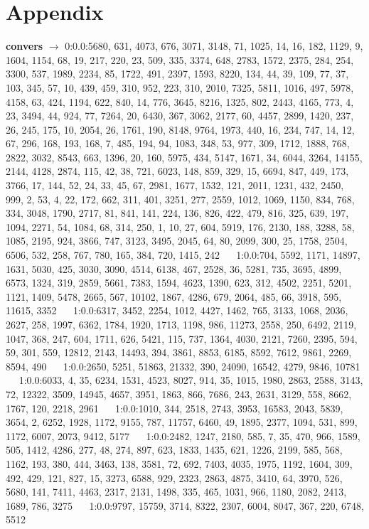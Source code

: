 \documentclass[a4paper,11pt,oneside]{book}
\begin{document}
\chapter{Appendix}

\textbf{convers} $\rightarrow$	0:0.0:5680, 631, 4073, 676, 3071, 3148, 71, 1025, 14, 16, 182, 1129, 9, 1604, 1154, 68, 19, 217, 220, 23, 509, 335, 3374, 648, 2783, 1572, 2375, 284, 254, 3300, 537, 1989, 2234, 85, 1722, 491, 2397, 1593, 8220, 134, 44, 39, 109, 77, 37, 103, 345, 57, 10, 439, 459, 310, 952, 223, 310, 2010, 7325, 5811, 1016, 497, 5978, 4158, 63, 424, 1194, 622, 840, 14, 776, 3645, 8216, 1325, 802, 2443, 4165, 773, 4, 23, 3494, 44, 924, 77, 7264, 20, 6430, 367, 3062, 2177, 60, 4457, 2899, 1420, 237, 26, 245, 175, 10, 2054, 26, 1761, 190, 8148, 9764, 1973, 440, 16, 234, 747, 14, 12, 67, 296, 168, 193, 168, 7, 485, 194, 94, 1083, 348, 53, 977, 309, 1712, 1888, 768, 2822, 3032, 8543, 663, 1396, 20, 160, 5975, 434, 5147, 1671, 34, 6044, 3264, 14155, 2144, 4128, 2874, 115, 42, 38, 721, 6023, 148, 859, 329, 15, 6694, 847, 449, 173, 3766, 17, 144, 52, 24, 33, 45, 67, 2981, 1677, 1532, 121, 2011, 1231, 432, 2450, 999, 2, 53, 4, 22, 172, 662, 311, 401, 3251, 277, 2559, 1012, 1069, 1150, 834, 768, 334, 3048, 1790, 2717, 81, 841, 141, 224, 136, 826, 422, 479, 816, 325, 639, 197, 1094, 2271, 54, 1084, 68, 314, 250, 1, 10, 27, 604, 5919, 176, 2130, 188, 3288, 58, 1085, 2195, 924, 3866, 747, 3123, 3495, 2045, 64, 80, 2099, 300, 25, 1758, 2504, 6506, 532, 258, 767, 780, 165, 384, 720, 1415, 242	$\quad$	1:0.0:704, 5592, 1171, 14897, 1631, 5030, 425, 3030, 3090, 4514, 6138, 467, 2528, 36, 5281, 735, 3695, 4899, 6573, 1324, 319, 2859, 5661, 7383, 1594, 4623, 1390, 623, 312, 4502, 2251, 5201, 1121, 1409, 5478, 2665, 567, 10102, 1867, 4286, 679, 2064, 485, 66, 3918, 595, 11615, 3352	$\quad$	1:0.0:6317, 3452, 2254, 1012, 4427, 1462, 765, 3133, 1068, 2036, 2627, 258, 1997, 6362, 1784, 1920, 1713, 1198, 986, 11273, 2558, 250, 6492, 2119, 1047, 368, 247, 604, 1711, 626, 5421, 115, 737, 1364, 4030, 2121, 7260, 2395, 594, 59, 301, 559, 12812, 2143, 14493, 394, 3861, 8853, 6185, 8592, 7612, 9861, 2269, 8594, 490	$\quad$	1:0.0:2650, 5251, 51863, 21332, 390, 24090, 16542, 4279, 9846, 10781	$\quad$	1:0.0:6033, 4, 35, 6234, 1531, 4523, 8027, 914, 35, 1015, 1980, 2863, 2588, 3143, 72, 12322, 3509, 14945, 4657, 3951, 1863, 866, 7686, 243, 2631, 3129, 558, 8662, 1767, 120, 2218, 2961	$\quad$	1:0.0:1010, 344, 2518, 2743, 3953, 16583, 2043, 5839, 3654, 2, 6252, 1928, 1172, 9155, 787, 11757, 6460, 49, 1895, 2377, 1094, 531, 899, 1172, 6007, 2073, 9412, 5177	$\quad$	1:0.0:2482, 1247, 2180, 585, 7, 35, 470, 966, 1589, 505, 1412, 4286, 277, 48, 274, 897, 623, 1833, 1435, 621, 1226, 2199, 585, 568, 1162, 193, 380, 444, 3463, 138, 3581, 72, 692, 7403, 4035, 1975, 1192, 1604, 309, 492, 429, 121, 827, 15, 3273, 6588, 929, 2323, 2863, 4875, 3410, 64, 3970, 526, 5680, 141, 7411, 4463, 2317, 2131, 1498, 335, 465, 1031, 966, 1180, 2082, 2413, 1689, 786, 3275	$\quad$	1:0.0:9797, 15759, 3714, 8322, 2307, 6004, 8047, 367, 220, 6748, 5512
\end{document}
